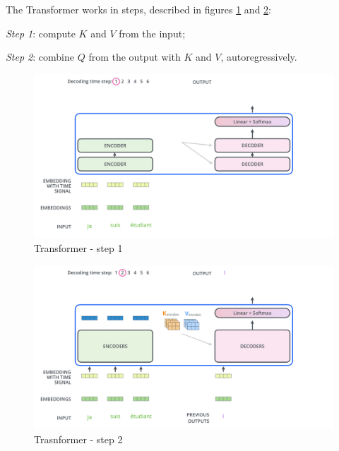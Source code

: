 The Transformer works in steps, described in figures \ref{fig:seq-transformer-3} and \ref{fig:seq-transformer-4}:
\begin{myitem}
    \item \textit{Step 1}: compute $K$ and $V$ from the input;
    \item \textit{Step 2}: combine $Q$ from the output with $K$ and $V$, autoregressively.
\end{myitem}

\begin{minipage}{.5\linewidth}
\begin{figure}[H]
    \centering
    \includegraphics[width=0.95\linewidth]{images/seq-transformer-3}
    \caption[Transformer - step 1]{Transformer - step 1}
    \label{fig:seq-transformer-3}
\end{figure}
\end{minipage}
\begin{minipage}{.5\linewidth}
    \begin{figure}[H]
        \centering
        \includegraphics[width=0.95\linewidth]{images/seq-transformer-4}
        \caption[Trasnformer - step 2]{Trasnformer - step 2}
        \label{fig:seq-transformer-4}
    \end{figure}
\end{minipage}

